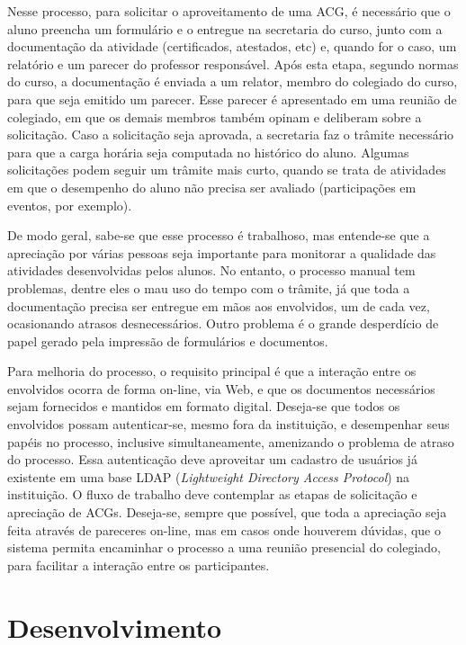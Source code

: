 \documentclass[12pt]{article}
\begin{document}
Nesse processo, para solicitar o aproveitamento de uma ACG, é necessário que o aluno preencha um formulário e o entregue na secretaria do curso, junto com a documentação da atividade (certificados, atestados, etc) e, quando for o caso, um relatório e um parecer do professor responsável. Após  esta  etapa,  segundo normas do curso, a documentação é enviada a um relator, membro do colegiado do curso, para que seja emitido um parecer. Esse parecer é apresentado em uma reunião de colegiado, em que os demais membros também opinam e deliberam sobre a solicitação. Caso a solicitação seja  aprovada, a secretaria faz o trâmite necessário para que a carga horária seja computada no histórico do aluno. Algumas solicitações podem seguir um trâmite mais curto, quando se trata de atividades em que o desempenho do aluno não precisa ser avaliado (participações em eventos, por exemplo).

De modo geral, sabe-se que esse processo é trabalhoso, mas entende-se que a apreciação por várias pessoas seja importante para monitorar a qualidade das atividades desenvolvidas pelos alunos. No entanto, o processo manual tem problemas, dentre eles o mau uso do tempo com o trâmite, já que toda a documentação precisa ser entregue em mãos aos envolvidos, um de cada vez, ocasionando atrasos desnecessários. Outro problema é o grande desperdício de papel gerado pela impressão de formulários e documentos.

Para melhoria do processo, o requisito principal é que a interação entre os envolvidos ocorra de forma on-line, via Web, e que os documentos necessários sejam fornecidos e mantidos em formato digital. Deseja-se que todos os envolvidos possam autenticar-se, mesmo fora da instituição, e desempenhar seus papéis no processo, inclusive simultaneamente, amenizando o problema de atraso do processo. Essa autenticação deve aproveitar um cadastro de usuários já existente em uma base LDAP (\emph{Lightweight Directory Access Protocol}) na instituição. O fluxo de trabalho deve contemplar as etapas de solicitação e apreciação de ACGs. Deseja-se, sempre que possível, que toda a apreciação seja feita através de pareceres on-line, mas em casos onde houverem dúvidas, que o sistema permita encaminhar o processo a uma reunião presencial do colegiado, para facilitar a interação entre os participantes.

\section{Desenvolvimento}
\end{document}
